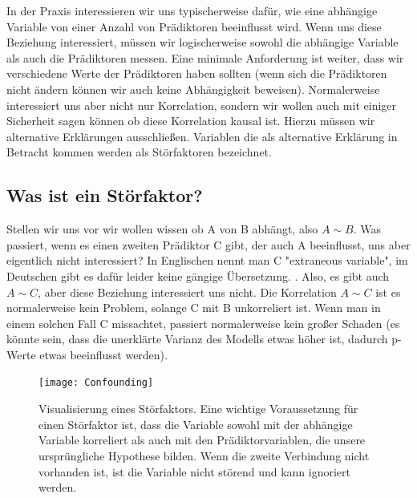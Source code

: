 \documentclass[a4paper,twoside]{tufte-book}\usepackage[]{graphicx}\usepackage[]{color}
\begin{document}
In der Praxis interessieren wir uns typischerweise dafür, wie eine abhängige Variable von einer Anzahl von Prädiktoren beeinflusst wird. Wenn uns diese Beziehung interessiert, müssen wir logischerweise sowohl die abhängige Variable als auch die Prädiktoren messen. Eine minimale Anforderung ist weiter, dass wir verschiedene Werte der Prädiktoren haben sollten (wenn sich die Prädiktoren nicht ändern können wir auch keine Abhängigkeit beweisen). Normalerweise interessiert uns aber nicht nur Korrelation, sondern wir wollen auch mit einiger Sicherheit sagen können ob diese Korrelation kausal ist. Hierzu müssen wir alternative Erklärungen ausschließen. Variablen die als alternative Erklärung in Betracht kommen werden als Störfaktoren bezeichnet.

\subsection{Was ist ein Störfaktor?}

Stellen wir uns vor wir wollen wissen ob A von B abhängt, also $A \sim B$. Was passiert, wenn es einen zweiten Prädiktor C gibt, der auch A beeinflusst, uns aber eigentlich nicht interessiert? In Englischen nennt man C "extraneous variable", im Deutschen gibt es dafür leider keine gängige Übersetzung. . Also, es gibt auch $A \sim C$, aber diese Beziehung interessiert uns nicht. Die Korrelation $A \sim C$ ist es normalerweise kein Problem, solange C mit B unkorreliert ist. Wenn man in einem solchen Fall C missachtet, passiert normalerweise kein großer Schaden (es könnte sein, dass die unerklärte Varianz des Modells etwas höher ist, dadurch p-Werte etwas beeinflusst werden).

\begin{figure}[]
\begin{center}
\texttt{[image: Confounding]}
\caption{Visualisierung eines Störfaktors. Eine wichtige Voraussetzung für einen Störfaktor ist, dass die Variable sowohl mit der abhängige Variable korreliert als auch mit den Prädiktorvariablen, die unsere ursprüngliche Hypothese bilden. Wenn die zweite Verbindung nicht vorhanden ist, ist die Variable nicht störend und kann ignoriert werden.}
\label{fig: Confounding}
\end{center}
\end{figure}
\end{document}

